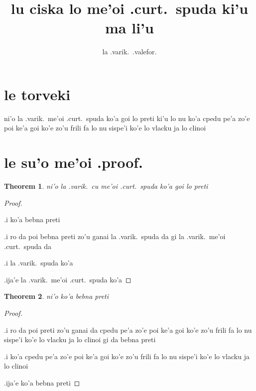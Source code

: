 \documentclass{article}
\title{lu ciska lo me'oi .curt.\ spuda ki'u ma li'u}
\author{la .varik.\ .valefor.}
\begin{document}
\newtheorem{thm}{Theorem}
\maketitle

\section{le torveki}
ni'o la .varik.\ me'oi .curt.\ spuda ko'a goi lo preti ki'u lo nu ko'a cpedu pe'a zo'e poi ke'a goi ko'e zo'u frili fa lo nu sispe'i ko'e lo vlacku ja lo clinoi

\section{le su'o me'oi .proof.}
\begin{thm}
	ni'o la .varik.\ cu me'oi .curt.\ spuda ko'a goi lo preti
\end{thm}
\begin{proof}
	${}$

	.i ko'a bebna preti

	.i ro da poi bebna preti zo'u ganai la .varik.\ spuda da gi la .varik.\ me'oi .curt.\ spuda da

	.i la .varik.\ spuda ko'a

	.ija'e la .varik.\ me'oi .curt.\ spuda ko'a
\end{proof}

\begin{thm}
	ni'o ko'a bebna preti
\end{thm}
\begin{proof}
	${}$

	.i ro da poi preti zo'u ganai da cpedu pe'a zo'e poi ke'a goi ko'e zo'u frili fa lo nu sispe'i ko'e lo vlacku ja lo clinoi gi da bebna preti

	.i ko'a cpedu pe'a zo'e poi ke'a goi ko'e zo'u frili fa lo nu sispe'i ko'e lo vlacku ja lo clinoi

	.ija'e ko'a bebna preti
\end{proof}
\end{document}
